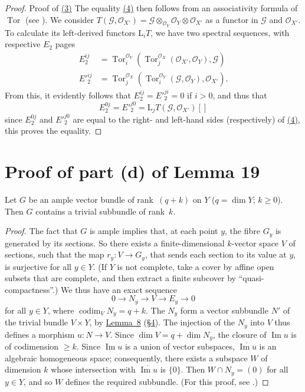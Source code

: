 \documentclass{article}
\theoremstyle{plain}
\newenvironment{lemma}[1]
    {\renewcommand\theinnerlemma{#1}\innerlemma}
    {\endinnerlemma}
\theoremstyle{definition}
\newcommand{\scr}[1]{{\mathscr{#1}}}
\newcommand{\LL}{\mathrm{L}}
\renewcommand{\geq}{\geqslant}
\DeclareMathOperator{\Tor}{Tor}
\DeclareMathOperator{\codim}{codim}
\newcommand{\oldpage}[1]{\marginpar{\footnotesize$\Big\vert$ \textit{p.~#1}}}
\begin{document}
\begin{proof}{Proof of {\hyperref[section15equation3]{(3)}}}
  The equality \hyperref[section15equation4]{(4)} then follows from an associativity formula of $\Tor$ (see \cite[p.~345]{3}).
  We consider $T(\scr{G},\scr{O}_{X'}) = \scr{G}\otimes_{\scr{O}_Y}\scr{O}_Y\otimes\scr{O}_{X'}$ as a functor in $\scr{G}$ and $\scr{O}_{X'}$.
  To calculate its left-derived functors $\LL_iT$, we have two spectral sequences, with respective $E_2$ pages
  \begin{align*}
    E_2^{ij} &= \Tor_i^{\scr{O}_Y}(\Tor_j^{\scr{O}_X}(\scr{O}_{X'},\scr{O}_Y),\scr{G})
  \\E'^{ij}_2 &= \Tor_j^{\scr{O}_X}(\Tor_i^{\scr{O}_Y}(\scr{G},\scr{O}_Y),\scr{O}_{X'}).
  \end{align*}
  From this, it evidently follows that $E_2^{ij}=E'^{ji}_2=0$ if $i>0$, and thus that
  \[
    E_2^{0j} = E'^{j0}_2 = \LL_jT(\scr{G},\scr{O}_{X'})[]
  \]
  since $E_2^{0j}$ and $E'^{j0}_2$ are equal to the right- and left-hand sides (respectively) of \hyperref[section15equation4]{(4)}, this proves the equality.
\end{proof}


\section{Proof of part (d) of Lemma 19}
\label{section16}

\begin{lemma}{20}
\label{lemma20}
  Let $G$ be an ample vector bundle of rank~$(q+k)$ on $Y$ ($q=\dim Y$; $k\geq0$).
  Then $G$ contains a trivial subbundle of rank~$k$.
\end{lemma}

\begin{proof}
  The fact that $G$ is ample implies that, at each point $y$, the fibre $G_y$ is generated by its sections.
  So there exists a finite-dimensional $k$-vector space $V$ of sections, such that the map $r_y\colon V\to G_y$, that sends each section to its value at $y$, is surjective for all $y\in Y$.
  (If $Y$ is not complete, take a cover by affine open subsets that are complete, and then extract a finite subcover by ``quasi-compactness''.)
  We thus have an exact sequence
  \[
    0 \to N_y \to V \to E_y \to 0
  \]
\oldpage{133}
  for all $y\in Y$, where $\codim_V N_y=q+k$.
  The $N_y$ form a vector subbundle $N'$ of the trivial bundle $V\times Y$, by \hyperref[lemma8]{Lemma~8} (\hyperref[section4]{\S4}).
  The injection of the $N_y$ into $V$ thus defines a morphism $u\colon N\to V$.
  Since $\dim V=q+\dim N_y$, the closure of $\operatorname{Im}u$ is of codimension $\geq k$.
  Since $\operatorname{Im}u$ is a union of vector subspaces, $\overline{\operatorname{Im}u}$ is an algebraic homogeneous space;
  consequently, there exists a subspace $W$ of dimension $k$ whose intersection with $\overline{\operatorname{Im}u}$ is $\{0\}$.
  Then $W\cap N_y=(0)$ for all $y\in Y$, and so $W$ defines the required subbundle.
  (For this proof, see \cite{1}.)
\end{proof}
\end{document}
